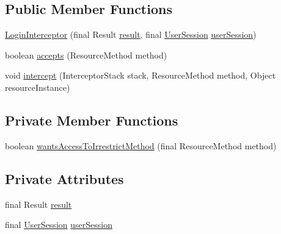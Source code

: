 \subsection*{Public Member Functions}
\begin{DoxyCompactItemize}
\item 
\hyperlink{classbr_1_1usp_1_1cata_1_1web_1_1interceptor_1_1_login_interceptor_a641a1f09926214e4247f780e29303340}{Login\+Interceptor} (final Result \hyperlink{classbr_1_1usp_1_1cata_1_1web_1_1interceptor_1_1_login_interceptor_abe28cfc61039e56a205ac98d49a76448}{result}, final \hyperlink{classbr_1_1usp_1_1cata_1_1web_1_1controller_1_1_user_session}{User\+Session} \hyperlink{classbr_1_1usp_1_1cata_1_1web_1_1interceptor_1_1_login_interceptor_a01a6b4e07b71366d1e49a081bf90e70c}{user\+Session})
\item 
boolean \hyperlink{classbr_1_1usp_1_1cata_1_1web_1_1interceptor_1_1_login_interceptor_a1f8a52cec81314d743bedf8fb526da9a}{accepts} (Resource\+Method method)
\item 
void \hyperlink{classbr_1_1usp_1_1cata_1_1web_1_1interceptor_1_1_login_interceptor_a748231f3128bf1aaeb8ec825e7519fa1}{intercept} (Interceptor\+Stack stack, Resource\+Method method, Object resource\+Instance)
\end{DoxyCompactItemize}
\subsection*{Private Member Functions}
\begin{DoxyCompactItemize}
\item 
boolean \hyperlink{classbr_1_1usp_1_1cata_1_1web_1_1interceptor_1_1_login_interceptor_a535abded7295c0b7b31a14845143077b}{wants\+Access\+To\+Irrestrict\+Method} (final Resource\+Method method)
\end{DoxyCompactItemize}
\subsection*{Private Attributes}
\begin{DoxyCompactItemize}
\item 
final Result \hyperlink{classbr_1_1usp_1_1cata_1_1web_1_1interceptor_1_1_login_interceptor_abe28cfc61039e56a205ac98d49a76448}{result}
\item 
final \hyperlink{classbr_1_1usp_1_1cata_1_1web_1_1controller_1_1_user_session}{User\+Session} \hyperlink{classbr_1_1usp_1_1cata_1_1web_1_1interceptor_1_1_login_interceptor_a01a6b4e07b71366d1e49a081bf90e70c}{user\+Session}
\end{DoxyCompactItemize}


